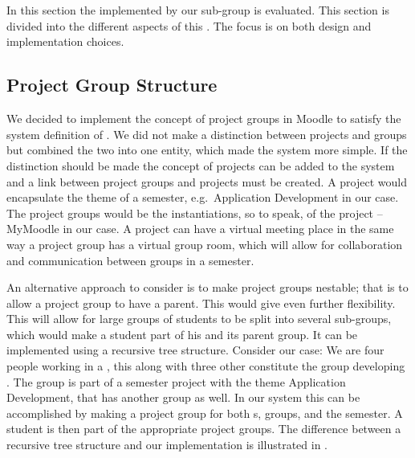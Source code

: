 \section{\administrationgroup{}}
\label{sec:productsubsystem}
In this section the \subsystem{} implemented by our sub-group is evaluated. 
This section is divided into the different aspects of this \subsystem{}.
The focus is on both design and implementation choices.

\subsection{Project Group Structure}
\label{sub:projectgroupstructure}
We decided to implement the concept of project groups in Moodle to satisfy the system definition of \system{}.
We did not make a distinction between projects and groups but combined the two into one entity, which made the system more simple. 
If the distinction should be made the concept of projects can be added to the system and a link between project groups and projects must be created.
A project would encapsulate the theme of a semester, e.g.\ Application Development in our case.
The project groups would be the instantiations, so to speak, of the project -- MyMoodle in our case.
A project can have a virtual meeting place in the same way a project group has a virtual group room, which will allow for collaboration and communication between groups in a semester. 

An alternative approach to consider is to make project groups nestable; that is to allow a project group to have a parent.
This would give even further flexibility.
This will allow for large groups of students to be split into several sub-groups, which would make a student part of his \subgroup{} and its parent group.
It can be implemented using a recursive tree structure.
Consider our case: We are four people working in a \subgroup{}, this \subgroup{} along with three other constitute the group developing \system{}.
The \system{} group is part of a semester project with the theme Application Development, that has another group as well.
In our system this can be accomplished by making a project group for both \subgroup{}s, groups, and the semester.
A student is then part of the appropriate project groups.
The difference between a recursive tree structure and our implementation is illustrated in .

